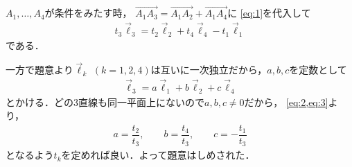 \documentclass[../../main.tex]{subfiles}
\begin{document}
$A_1,\ldots,A_4$が条件をみたす時，
$\overrightarrow{A_1A_3}=\overrightarrow{A_1A_2}+\overrightarrow{A_1A_4}$に
\cref{eq:1}を代入して
\begin{align}
  t_3\vec{\ell}_3=t_2\vec{\ell}_2+t_4\vec{\ell}_4-t_1\vec{\ell}_1 \label{eq:2}
\end{align}
である．

一方で題意より$\vec{\ell}_k$ $(k=1,2,4)$は互いに一次独立だから，$a,b,c$を定数として
\begin{align}
  \vec{\ell}_3=a\vec{\ell}_1+b\vec{\ell}_2+c\vec{\ell}_4 \label{eq:3}
\end{align}
とかける．どの3直線も同一平面上にないので$a,b,c\ne 0$だから，
\cref{eq:2,eq:3}より，
\begin{align}a=\dfrac{t_2}{t_3},\qquad b=\dfrac{t_4}{t_3},\qquad c=-\dfrac{t_1}{t_3}
\end{align}
となるよう$t_k$を定めれば良い．よって題意はしめされた．
\end{document}
